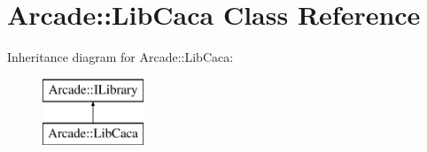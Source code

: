 \hypertarget{class_arcade_1_1_lib_caca}{}\section{Arcade\+:\+:Lib\+Caca Class Reference}
\label{class_arcade_1_1_lib_caca}
Inheritance diagram for Arcade\+:\+:Lib\+Caca\+:\begin{figure}[H]
\begin{center}
\leavevmode
\includegraphics[height=2.000000cm]{class_arcade_1_1_lib_caca}
\end{center}
\end{figure}
